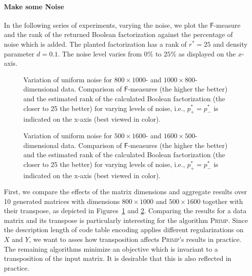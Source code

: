 \paragraph{Make some Noise}
In the following series of experiments, varying the noise, we plot the $\mathsf{F}$-measure and the rank of the returned Boolean factorization against the percentage of noise which is added. The planted factorization has a rank of $r^*=25$ and density parameter $d=0.1$. The noise level varies from $0\%$ to $25\%$ as displayed on the $x$-axis.  
\begin{figure}
\centering

\caption{Variation of uniform noise for $800\times 1000$- and $1000\times 800$-dimensional data. Comparison of $\mathsf{F}$-measures (the higher the better) and the estimated rank of the calculated Boolean factorization (the closer to 25 the better) for varying levels of noise, i.e., $p_+^*=p_-^*$ is indicated on the x-axis (best viewed in color).}
\label{fig:noise810}
\end{figure}
\begin{figure}
\centering

\caption{Variation of uniform noise for $500\times 1600$- and $1600\times 500$-dimensional data. Comparison of $\mathsf{F}$-measures (the higher the better) and the estimated rank of the calculated Boolean factorization (the closer to 25 the better) for varying levels of noise, i.e., $p_+^*=p_-^*$ is indicated on the x-axis (best viewed in color).}
\label{fig:noise516}
\end{figure}

First, we compare the effects of the matrix dimensions and aggregate results over 10 generated matrices with dimensions $800\times 1000$ and $500\times 1600$ together with their transpose, as depicted in Figures~\ref{fig:noise810} and \ref{fig:noise516}. Comparing the results for a data matrix and its transpose is particularly interesting for the algorithm \textsc{Primp}. Since the description length of code table encoding applies different regularizations on $X$ and $Y$, we want to asses how transposition affects \textsc{Primp}'s results in practice. The remaining algorithms minimize an objective which is invariant to a transposition of the input matrix. It is desirable that this is also reflected in practice.

